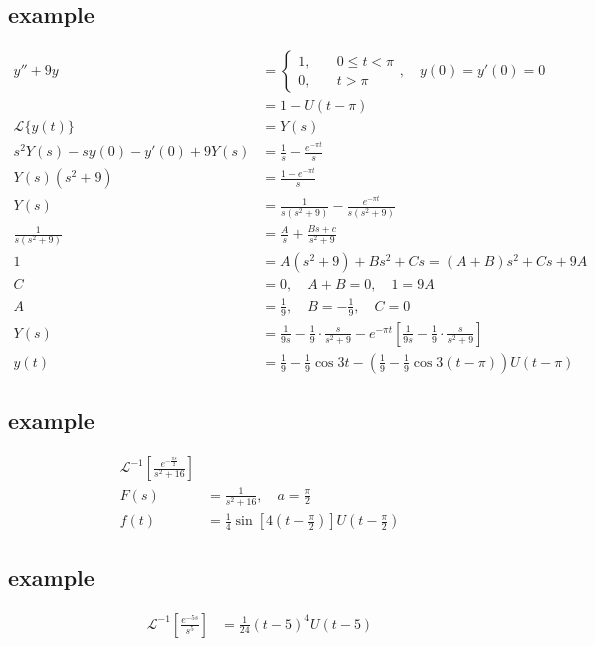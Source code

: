 \documentclass{article}
\begin{document}
\subsection*{example}
\begin{align*}
  y''+9y&=\left\{
  \begin{aligned}
    1,\quad&0\leq t<\pi\\
    0,\quad&t>\pi
  \end{aligned}
  \right.,\quad y(0)=y'(0)=0\\
  &=1-U(t-\pi)\\
  \mathcal{L}\{y(t)\}&=Y(s)\\
  s^2Y(s)-sy(0)-y'(0)+9Y(s)&=\frac{1}{s}-\frac{e^{-\pi t}}{s}\\
  Y(s)(s^2+9)&=\frac{1-e^{-\pi t}}{s}\\
  Y(s)&=\frac{1}{s(s^2+9)}-\frac{e^{-\pi t}}{s(s^2+9)}\\
  \frac{1}{s(s^2+9)}&=\frac{A}{s}+\frac{Bs+c}{s^2+9}\\
  1&=A(s^2+9)+Bs^2+Cs=(A+B)s^2+Cs+9A\\
  C&=0,\quad A+B=0,\quad 1=9A\\
  A&=\frac{1}{9},\quad B=-\frac{1}{9},\quad C=0\\
  Y(s)&=\frac{1}{9s}-\frac{1}{9}\cdot\frac{s}{s^2+9}-e^{-\pi t}\left[\frac{1}{9s}-\frac{1}{9}\cdot\frac{s}{s^2+9}\right]\\
  y(t)&=\frac{1}{9}-\frac{1}{9}\cos 3t-\left(\frac{1}{9}-\frac{1}{9}\cos3(t-\pi)\right)U(t-\pi)
\end{align*}
\subsection*{example}
\begin{align*}
  \mathcal{L}^{-1}\left[\frac{e^{-\frac{\pi s}{2}}}{s^2+16}\right]\\
  F(s)&=\frac{1}{s^2+16},\quad a=\frac{\pi}{2}\\
  f(t)&=\frac{1}{4}\sin \left[4\left(t-\frac{\pi}{2}\right)\right]U\left(t-\frac{\pi}{2}\right)
\end{align*}
\subsection*{example}
\begin{align*}
  \mathcal{L}^{-1}\left[\frac{e^{-5s}}{s^5}\right]&=\frac{1}{24}(t-5)^4U(t-5)
\end{align*}
\end{document}
